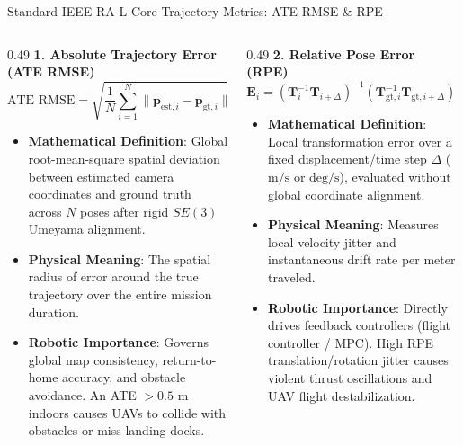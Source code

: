 \documentclass[aspectratio=169, 10pt]{beamer}
\begin{document}
\begin{frame}{Standard IEEE RA-L Core Trajectory Metrics: ATE RMSE \& RPE}
  \begin{columns}[T]
    \begin{column}{0.49\textwidth}
      {\small \textbf{\textcolor{NavyBlue}{1. Absolute Trajectory Error (ATE RMSE)}}}
      \begin{equation}
        \text{ATE RMSE} = \sqrt{\frac{1}{N} \sum_{i=1}^N \|\mathbf{p}_{\text{est}, i} - \mathbf{p}_{\text{gt}, i}\|^2}
      \end{equation}
      \scriptsize
      \begin{itemize}
        \setlength{\itemsep}{1.5pt}
        \item \textbf{Mathematical Definition}: Global root-mean-square spatial deviation between estimated camera coordinates and ground truth across $N$ poses after rigid $SE(3)$ Umeyama alignment.
        \item \textbf{Physical Meaning}: The spatial radius of error around the true trajectory over the entire mission duration.
        \item \textbf{Robotic Importance}: Governs global map consistency, return-to-home accuracy, and obstacle avoidance. An ATE $> 0.5\text{ m}$ indoors causes UAVs to collide with obstacles or miss landing docks.
      \end{itemize}
    \end{column}

    \begin{column}{0.49\textwidth}
      {\small \textbf{\textcolor{NavyBlue}{2. Relative Pose Error (RPE)}}}
      \begin{equation}
        \mathbf{E}_i = (\mathbf{T}_i^{-1} \mathbf{T}_{i+\Delta})^{-1} (\mathbf{T}_{\text{gt},i}^{-1} \mathbf{T}_{\text{gt},i+\Delta}) \in SE(3)
      \end{equation}
      \scriptsize
      \begin{itemize}
        \setlength{\itemsep}{1.5pt}
        \item \textbf{Mathematical Definition}: Local transformation error over a fixed displacement/time step $\Delta$ ($\text{m/s}$ or $\text{deg/s}$), evaluated without global coordinate alignment.
        \item \textbf{Physical Meaning}: Measures local velocity jitter and instantaneous drift rate per meter traveled.
        \item \textbf{Robotic Importance}: Directly drives feedback controllers (flight controller / MPC). High RPE translation/rotation jitter causes violent thrust oscillations and UAV flight destabilization.
      \end{itemize}
    \end{column}
  \end{columns}
\end{frame}
\end{document}

